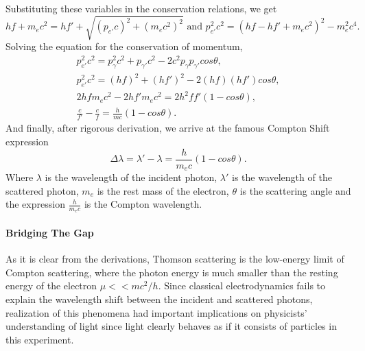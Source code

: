 		Substituting these variables in the conservation relations, we get
		\begin{equation}
			h f + m_e c^2 = h f' + \sqrt{(p_{e'} c)^2 + (m_e c^2)^2} \text{ and }
			p_{e'}^2 c^2 = (h f - h f' + m_e c^2)^2 - m_e^2 c^4.
		\end{equation}
		Solving the equation for the conservation of momentum,
		\begin{align*}
			p_{e'}^2 c^2 = p_\gamma^2 c^2 + p_{\gamma'} c^2 - 2 c^2 p_\gamma p_{\gamma'} cos\theta, \\
			p_{e'}^2 c^2 = (h f)^2 + (h f')^2 - 2 (h f) (h f') cos\theta, \\
			2 h f m_e c^2 - 2 h f' m_e c^2 = 2 h^2 f f' (1 - cos\theta), \\
			\frac{c}{f'} - \frac{c}{f} = \frac{h}{m c} (1 - cos\theta).
		\end{align*}
		And finally, after rigorous derivation, we arrive at the famous Compton Shift expression
		\begin{equation}
			\Delta \lambda = \lambda' - \lambda = \frac{h}{m_e c} (1 - cos\theta).
		\end{equation}
		Where $\lambda$ is the wavelength of the incident photon, $\lambda'$ is the wavelength of the scattered photon, $m_e$ is the rest mass of the electron, $\theta$ is the scattering angle and the expression $\frac{h}{m_e c}$ is the Compton wavelength. 
		
		\paragraph{Bridging The Gap}
			As it is clear from the derivations, Thomson scattering is the low-energy limit of Compton scattering, where the photon energy is much smaller than the resting energy of the electron $\mu << m c^2 / h$. Since classical electrodynamics fails to explain the wavelength shift between the incident and scattered photons, realization of this phenomena had important implications on physicists' understanding of light since light clearly behaves as if it consists of particles in this experiment. 